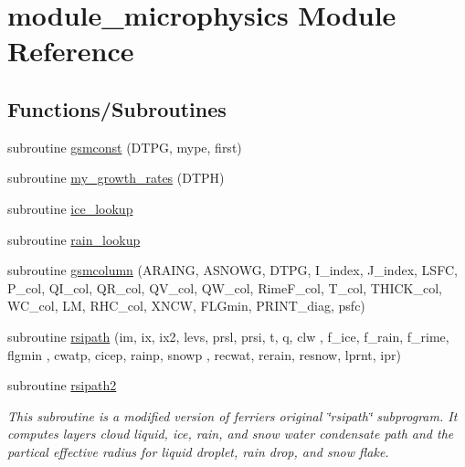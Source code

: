 \hypertarget{namespacemodule__microphysics}{}\section{module\+\_\+microphysics Module Reference}
\label{namespacemodule__microphysics}
\subsection*{Functions/\+Subroutines}
\begin{DoxyCompactItemize}
\item 
subroutine \hyperlink{namespacemodule__microphysics_ad5f89457c2cd2ba431b1c60d5ecbecc4}{gsmconst} (D\+T\+PG, mype, first)
\item 
subroutine \hyperlink{namespacemodule__microphysics_aa41d6b0b3b4eca4b41999d6c6aadb317}{my\+\_\+growth\+\_\+rates} (D\+T\+PH)
\item 
subroutine \hyperlink{namespacemodule__microphysics_a9273c6542f2e983e0f9040c80907b3c6}{ice\+\_\+lookup}
\item 
subroutine \hyperlink{namespacemodule__microphysics_a0090b42e85bd381e5459a9e8db9dc120}{rain\+\_\+lookup}
\item 
subroutine \hyperlink{namespacemodule__microphysics_a9874b115916d29a6688228ce0a5c2886}{gsmcolumn} (A\+R\+A\+I\+NG, A\+S\+N\+O\+WG, D\+T\+PG, I\+\_\+index, J\+\_\+index,           L\+S\+FC, P\+\_\+col, Q\+I\+\_\+col, Q\+R\+\_\+col, Q\+V\+\_\+col, Q\+W\+\_\+col, Rime\+F\+\_\+col, T\+\_\+col,       T\+H\+I\+C\+K\+\_\+col, W\+C\+\_\+col, LM, R\+H\+C\+\_\+col, X\+N\+CW, F\+L\+Gmin, P\+R\+I\+N\+T\+\_\+diag, psfc)
\item 
subroutine \hyperlink{namespacemodule__microphysics_a3e5e830e9ac0ef923bf65dda93abce33}{rsipath} (im, ix, ix2, levs, prsl, prsi, t, q, clw                   ,                                                               f\+\_\+ice, f\+\_\+rain, f\+\_\+rime, flgmin                                                               ,                                                               cwatp, cicep, rainp, snowp                                                                           ,                                                               recwat, rerain, resnow, lprnt, ipr)
\end{DoxyCompactItemize}
{\bf }\par
\begin{DoxyCompactItemize}
\item 
subroutine \hyperlink{group__module__radiation__clouds_ga3645dec44f2cc7e30b57d32531f74ba4}{rsipath2}
\begin{DoxyCompactList}\small\item\em This subroutine is a modified version of ferrier\textquotesingle{}s original \char`\"{}rsipath\char`\"{} subprogram. It computes layer\textquotesingle{}s cloud liquid, ice, rain, and snow water condensate path and the partical effective radius for liquid droplet, rain drop, and snow flake. \end{DoxyCompactList}\end{DoxyCompactItemize}

